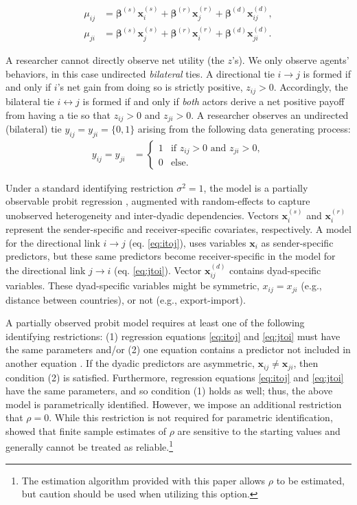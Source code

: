 \documentclass[a4paper, 12pt]{article}
\begin{document}
\begin{align}
    \mu_{ij} & = \bm{\beta}^{(s)}\bm{x}_i^{(s)} + \bm{\beta}^{(r)}\bm{x}_j^{(r)} + \bm{\beta}^{(d)}\bm{x}_{ij}^{(d)}, \label{eq:itoj}\\
    \mu_{ji} & = \bm{\beta}^{(s)}\bm{x}_j^{(s)} + \bm{\beta}^{(r)}\bm{x}_i^{(r)} + \bm{\beta}^{(d)}\bm{x}_{ji}^{(d)} \label{eq:jtoi}.
\end{align}

A researcher cannot directly observe net utility (the $z$'s).  We only observe agents' behaviors, in this case undirected \emph{bilateral} ties. A directional tie $i \to j$ is formed if and only if $i$'s net gain from doing so is strictly positive, $z_{ij} > 0$.  Accordingly, the bilateral tie $i \leftrightarrow j$ is formed if and only if \emph{both} actors derive a net positive payoff from having a tie so that $z_{ij} > 0$ and $z_{ji} > 0$. A researcher observes an undirected (bilateral) tie $y_{ij} = y_{ji} = \{0, 1\}$ arising from the following data generating process:
\begin{align}
y_{ij} = y_{ji} & =   \left\{ \begin{array}{ll}
         1 & \mbox{if $z_{ij} > 0$ and $z_{ji} > 0$},\\
         0 & \mbox{else}.\end{array} \right. \label{mod:y}
\end{align}

Under a standard identifying restriction $\sigma^2 = 1$, the model is a partially observable probit regression \citep{poirier:1980}, augmented with random-effects to capture unobserved heterogeneity and inter-dyadic dependencies. Vectors $\bm{x}_i^{(s)}$ and $\bm{x}_i^{(r)}$ represent the sender-specific and receiver-specific covariates, respectively. A model for the directional link $i \to j$ (eq. \ref{eq:itoj}), uses variables $\bm{x}_i$ as sender-specific predictors, but these same predictors become receiver-specific in the model for the directional link $j \to i$ (eq. \ref{eq:jtoi}). Vector $\bm{x}_{ij}^{(d)}$ contains dyad-specific variables. These dyad-specific variables might be symmetric, $x_{ij} = x_{ji}$ (e.g., distance between countries), or not (e.g., export-import).

A partially observed probit model requires at least one of the following identifying restrictions: (1) regression equations \ref{eq:itoj} and \ref{eq:jtoi} must have the same parameters and/or (2) one equation contains a predictor not included in another equation \citep{poirier:1980}. If the dyadic predictors are asymmetric, $\bm{x}_{ij} \neq \bm{x}_{ji}$, then condition (2) is satisfied. Furthermore, regression equations \ref{eq:itoj} and \ref{eq:jtoi} have the same parameters, and so condition (1) holds as well; thus, the above model is parametrically identified. However, we impose an additional restriction that $\rho = 0$. While this restriction is not required for parametric identification, \citet{rajbhandari:2014} showed that finite sample estimates of $\rho$ are sensitive to the starting values and generally cannot be treated as reliable.\footnote{The estimation algorithm provided with this paper allows $\rho$ to be estimated, but caution should be used when utilizing this option.}
 
\end{document}
